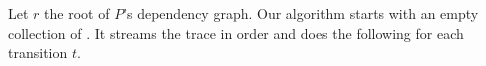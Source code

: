 
Let $r$ the root of $P$'s dependency graph. Our algorithm starts with
an empty collection of \PMS. It streams the trace in order and does
the following for each transition $t$.


